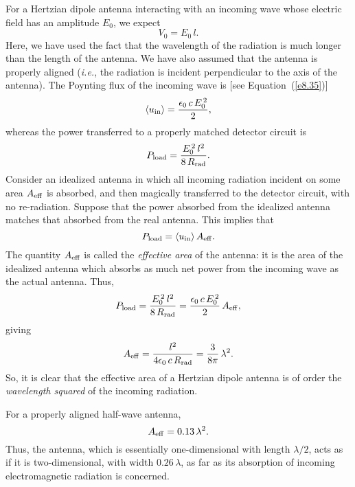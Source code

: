 For a Hertzian dipole antenna interacting with an incoming wave whose electric
field has an amplitude $E_0$, we expect
\begin{equation}
V_0 = E_0\, l.
\end{equation}
Here, we have used the fact that the wavelength of the radiation is much longer
than the length of the antenna. We have also assumed that the antenna is
properly aligned ({\em i.e.}, the radiation is incident perpendicular to the axis of the
antenna). The Poynting flux of the incoming wave is [see Equation~(\ref{e8.35})]
\begin{equation}
\langle u_{\rm in}\rangle = \frac{\epsilon_0\, c\, E_0^{\,2}}{2},
\end{equation} 
whereas the power transferred to a properly matched detector circuit is
\begin{equation}
P_{\rm load} = \frac{E_0^{\,2} \,l^2}{8\, R_{\rm rad}}.
\end{equation}
Consider an idealized antenna in which all 
incoming radiation incident on some area $A_{\rm eff}$ is  absorbed, and then
magically transferred to the detector circuit, with no re-radiation. 
Suppose  that the power absorbed from the idealized antenna
 matches that absorbed from
 the
real antenna. This implies that
\begin{equation}
P_{\rm load} = \langle u_{\rm in}\rangle\, A_{\rm eff}.
\end{equation}
 The quantity $A_{\rm eff}$ is called the {\em effective area}\/ of the antenna: it is
the area of the idealized antenna which absorbs as much net power from the incoming 
wave as the actual antenna. 
Thus,
\begin{equation}
P_{\rm load} =\frac{ E_0^{\,2}\, l^2}{8 \,R_{\rm rad} } = \frac{\epsilon_0\, c\, E_0^{\,2}}{2}
\,A_{\rm eff},
\end{equation}
giving
\begin{equation}
A_{\rm eff} = \frac{l^2}{4\epsilon_0 \,c\, R_{\rm rad}} = \frac{3}{8\pi}\,\lambda^2.
\end{equation}
So, it is clear that the effective area of a Hertzian dipole antenna is of
order the {\em wavelength squared}\/ of the incoming radiation. 

For a properly aligned half-wave antenna,
\begin{equation}
A_{\rm eff} = 0.13\,\lambda^2.
\end{equation}
Thus, the antenna, which is essentially one-dimensional with length $\lambda/2$,
acts as if it is two-dimensional, with width $0.26\,\lambda$, as far as its
absorption of incoming electromagnetic radiation is concerned.  

